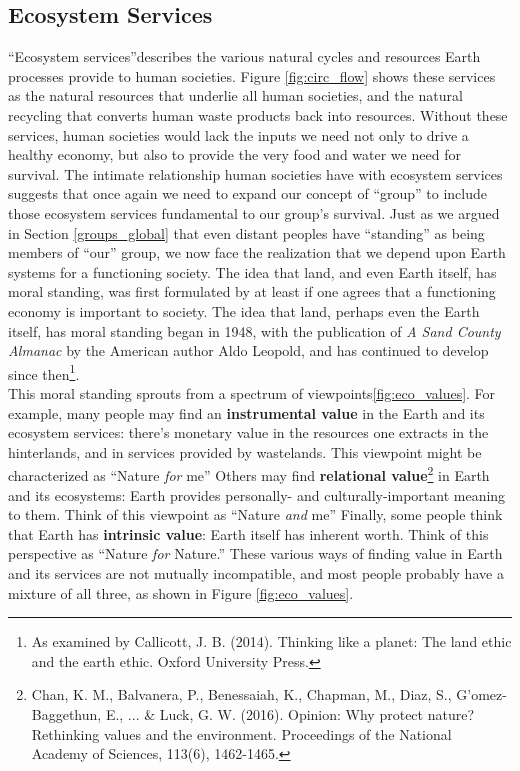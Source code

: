 \subsection{Ecosystem Services}\label{eco_servs}
``Ecosystem services''describes the various natural cycles and resources Earth processes provide to human societies. Figure \ref{fig:circ_flow} shows these services as the natural resources that underlie all human societies, and the natural recycling that converts human waste products back into resources. Without these services, human societies would lack the inputs we need not only to drive a healthy economy, but also to provide the very food and water we need for survival. The intimate relationship human societies have with ecosystem services suggests that once again we need to expand our concept of ``group'' to include those ecosystem services fundamental to our group's survival. Just as we argued in Section \ref{groups_global} that even distant peoples have ``standing'' as being members of ``our'' group, we now face the realization that we depend upon Earth systems for a functioning society. The idea that land, and even Earth itself, has moral standing, was first formulated by at least if one agrees that a functioning economy is important to society. The idea that land, perhaps even the Earth itself, has moral standing began in 1948, with the publication of \textit{A Sand County Almanac} by the American author Aldo Leopold, and has continued to develop since then\footnote{As examined by Callicott, J. B. (2014). Thinking like a planet: The land ethic and the earth ethic. Oxford University Press.}.\\

This moral standing sprouts from a spectrum of viewpoints\ref{fig:eco_values}. For example, many people may find an \textbf{instrumental value} in the Earth and its ecosystem services: there's monetary value in the resources one extracts in the hinterlands, and in services provided by wastelands. This viewpoint might be characterized as ``Nature \emph{for} me'' Others may find \textbf{relational value}\footnote{Chan, K. M., Balvanera, P., Benessaiah, K., Chapman, M., Diaz, S., G'omez-Baggethun, E., ... \& Luck, G. W. (2016). Opinion: Why protect nature? Rethinking values and the environment. Proceedings of the National Academy of Sciences, 113(6), 1462-1465.} in Earth and its ecosystems: Earth provides personally- and culturally-important meaning to them. Think of this viewpoint as ``Nature \emph{and} me'' Finally, some people think that Earth has \textbf{intrinsic value}: Earth itself has inherent worth. Think of this perspective as ``Nature \emph{for} Nature.'' These various ways of finding value in Earth and its services are not mutually incompatible, and most people probably have a mixture of all three, as shown in Figure \ref{fig:eco_values}.\\
 

